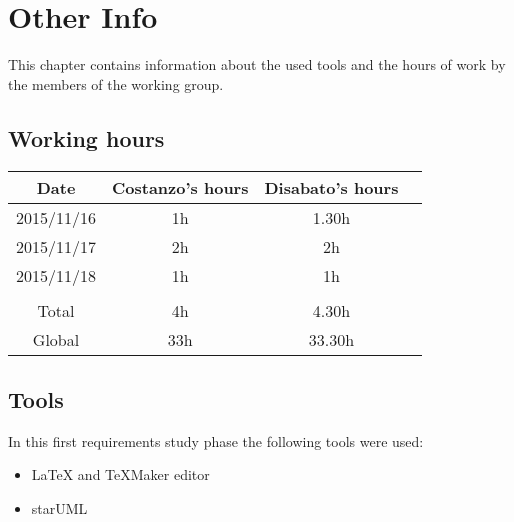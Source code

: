 \documentclass[../dd]{subfiles}
\begin{document}
\chapter{Other Info}
\label{other_info}

\setmyfancystyle

This chapter contains information about the used tools and the hours of work by the members of the working group.

\section{Working hours}
\begin{table}[h!]
\begin{tabular}{cccc}
\hline
Date & Costanzo's hours & Disabato's hours  &    \\ \hline
2015/11/16 & 1h & 1.30h &    \\ \hline
2015/11/17 & 2h & 2h &    \\ \hline 
2015/11/18 & 1h & 1h &    \\ \hline \\
Total & 4h & 4.30h & \\ \hline
Global & 33h & 33.30h & \\ \hline

\end{tabular}
\end{table}

\section{Tools}
In this first requirements study phase the following tools were used:
\begin{itemize}
	\item \LaTeX{} and TeXMaker editor
	\item starUML
\end{itemize}
\end{document}
